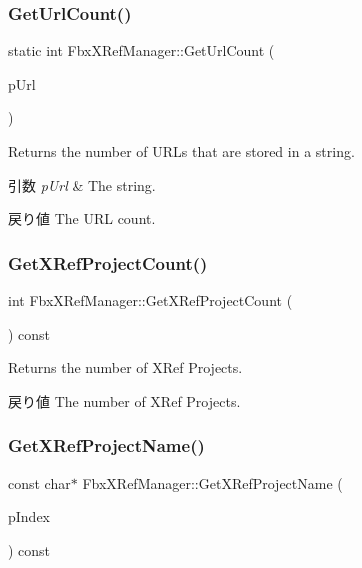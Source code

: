 \subsubsection{\texorpdfstring{Get\+Url\+Count()}{GetUrlCount()}\hspace{0.1cm}{\footnotesize\ttfamily [2/2]}}
{\footnotesize\ttfamily static int Fbx\+X\+Ref\+Manager\+::\+Get\+Url\+Count (\begin{DoxyParamCaption}\item[{\hyperlink{class_fbx_string}{Fbx\+String} const \&}]{p\+Url }\end{DoxyParamCaption})\hspace{0.3cm}{\ttfamily [static]}}

Returns the number of U\+R\+Ls that are stored in a string. 
\begin{DoxyParams}{引数}
{\em p\+Url} & The string. \\
\hline
\end{DoxyParams}
\begin{DoxyReturn}{戻り値}
The U\+RL count. 
\end{DoxyReturn}
\mbox{\label{class_fbx_x_ref_manager_a3d2b5a3a323b7312b7c4344879791976}} 
\subsubsection{\texorpdfstring{Get\+X\+Ref\+Project\+Count()}{GetXRefProjectCount()}}
{\footnotesize\ttfamily int Fbx\+X\+Ref\+Manager\+::\+Get\+X\+Ref\+Project\+Count (\begin{DoxyParamCaption}{ }\end{DoxyParamCaption}) const}

Returns the number of X\+Ref Projects. \begin{DoxyReturn}{戻り値}
The number of X\+Ref Projects. 
\end{DoxyReturn}
\mbox{\label{class_fbx_x_ref_manager_afdff8c02aaecef12bed630152ba4e2c4}} 
\subsubsection{\texorpdfstring{Get\+X\+Ref\+Project\+Name()}{GetXRefProjectName()}}
{\footnotesize\ttfamily const char$\ast$ Fbx\+X\+Ref\+Manager\+::\+Get\+X\+Ref\+Project\+Name (\begin{DoxyParamCaption}\item[{int}]{p\+Index }\end{DoxyParamCaption}) const}

